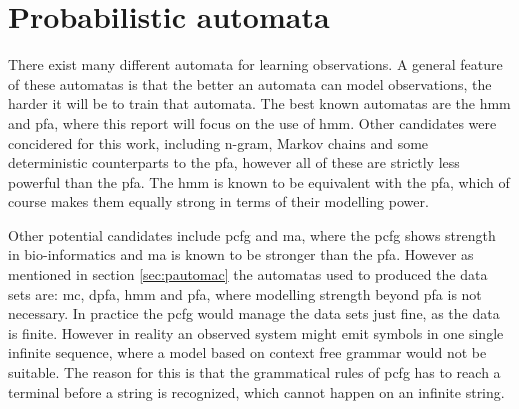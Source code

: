 \section{Probabilistic automata}
There exist many different automata for learning observations. A general feature of these automatas is that the better an automata can model observations, the harder it will be to train that automata. The best known automatas are the \gls{hmm} and \gls{pfa}, where this report will focus on the use of \gls{hmm}.\cite{pautomacTR}
Other candidates were concidered for this work, including n-gram, Markov chains and some deterministic counterparts to the \gls{pfa}, however all of these are strictly less powerful than the \gls{pfa}. The \gls{hmm} is known to be equivalent with the \gls{pfa}, which of course makes them equally strong in terms of their modelling power.

Other potential candidates include \gls{pcfg} and \gls{ma}, where the \gls{pcfg} shows strength in bio-informatics and \gls{ma} is known to be stronger than the \gls{pfa}. However as mentioned in section \ref{sec:pautomac} the automatas used to produced the data sets are: \gls{mc}, \gls{dpfa}, \gls{hmm} and \gls{pfa}, where modelling strength beyond \gls{pfa} is not necessary. In practice the \gls{pcfg} would manage the data sets just fine, as the data is finite. However in reality an observed system might emit symbols in one single infinite sequence, where a model based on context free grammar would not be suitable. The reason for this is that the grammatical rules of \gls{pcfg} has to reach a terminal before a string is recognized, which cannot happen on an infinite string.